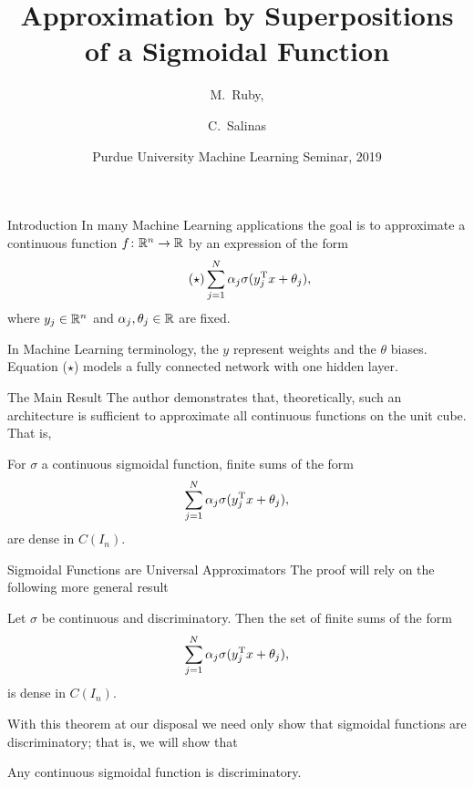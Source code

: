 \documentclass[11pt,letterpaper]{beamer}
\title[Approximation by a Sigmoidal Function] 
{Approximation by Superpositions of a Sigmoidal Function}
\author[M.\ Ruby, C.\ Salinas] 
{M.\ Ruby,%
  \and C.\ Salinas%
}
\institute[Purdue University] %
{
  Department of Mathematics\\
  Purdue University
 }
\date[Spring 2019] %
{Purdue University Machine Learning Seminar, 2019}
\begin{document}
\frame{\titlepage}

\begin{frame}{Introduction}
  In many Machine Learning applications the goal is to approximate a continuous
  function $f\colon\mathbb{R}^n\to\mathbb{R}$ by an expression of the form
  \begin{equation*}
    \tag{$\star$}
    \sum_{j=1}^N \alpha_j\sigma( y_j^{\mathrm{T}} x+\theta_j),
  \end{equation*}
  where $ y_j\in\mathbb{R}^n$ and $\alpha_j,\theta_j\in\mathbb{R}$ are fixed.

  In Machine Learning terminology, the $ y$ represent weights and the $\theta$
  biases. Equation ($\star$) models a fully connected network with one hidden
  layer.
\end{frame}

\begin{frame}{The Main Result}
  The author demonstrates that, theoretically, such an architecture is
  sufficient to approximate all continuous functions on the unit cube. That is,
  \begin{theorem}
    For $\sigma$ a continuous sigmoidal function, finite sums of the form
    \[
      \sum_{j=1}^N \alpha_j\sigma( y_j^{\mathrm{T}} x+\theta_j),
    \]
    are dense in $C(I_n)$.
  \end{theorem}
\end{frame}

\begin{frame}{Sigmoidal Functions are Universal Approximators}
  The proof will rely on the following more general result
  \begin{theorem}
    Let $\sigma$ be continuous and discriminatory. Then the set of finite sums
    of the form
    \[
      \sum_{j=1}^N \alpha_j\sigma( y_j^{\mathrm{T}} x+\theta_j),
    \]
    is dense in $C(I_n)$.
  \end{theorem}
  With this theorem at our disposal we need only show that sigmoidal functions
  are discriminatory; that is, we will show that
    \begin{lemma}
      Any continuous sigmoidal function is discriminatory.
  \end{lemma}
\end{frame}
\end{document}
